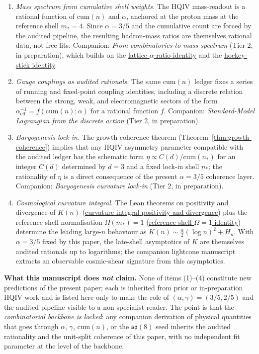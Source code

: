 \documentclass[11pt]{amsart}
\begin{document}
\begin{enumerate}
  \item \emph{Mass spectrum from cumulative shell weights.} The HQIV mass-readout is a rational function of \(\mathrm{cum}(n)\) and \(\alpha\), anchored at the proton mass at the reference shell \(m_\ast=4\). Since \(\alpha=3/5\) and the cumulative count are forced by the audited pipeline, the resulting hadron-mass ratios are themselves rational data, not free fits. Companion: \emph{From combinatorics to mass spectrum} (Tier 2, in preparation), which builds on the \hyperref[lean:lattice-ratio]{lattice \(\alpha\)-ratio identity} and the \hyperref[lean:hockey-stick]{hockey-stick identity}.
  \item \emph{Gauge couplings as audited rationals.} The same \(\mathrm{cum}(n)\) ledger fixes a series of running and fixed-point coupling identities, including a discrete relation between the strong, weak, and electromagnetic sectors of the form \(\alpha_{\text{eff}}^{-1}=f(\mathrm{cum}(n);\alpha)\) for a rational function \(f\). Companion: \emph{Standard-Model Lagrangian from the discrete action} (Tier 2, in preparation).
  \item \emph{Baryogenesis lock-in.} The growth-coherence theorem (Theorem~\ref{thm:growth-coherence}) implies that any HQIV asymmetry parameter compatible with the audited ledger has the schematic form \(\eta\propto C(d)/\mathrm{cum}(n_\ast)\) for an integer \(C(d)\) determined by \(d=3\) and a fixed lock-in shell \(n_\ast\); the rationality of \(\eta\) is a direct consequence of the present \(\alpha=3/5\) coherence layer. Companion: \emph{Baryogenesis curvature lock-in} (Tier 2, in preparation).
  \item \emph{Cosmological curvature integral.} The Lean theorems on positivity and divergence of \(K(n)\) (\hyperref[lean:curvature-int]{curvature integral positivity and divergence}) plus the reference-shell normalisation \(\Omega(m_\ast)=1\) (\hyperref[lean:omega-ref]{reference-shell \(\Omega=1\) identity}) determine the leading large-\(n\) behaviour as \(K(n)\sim \tfrac{\alpha}{2}(\log n)^2 + H_n\). With \(\alpha=3/5\) fixed by this paper, the late-shell asymptotics of \(K\) are themselves audited rationals up to logarithms; the companion lightcone manuscript \cite{hqiv-lightcone-paper} extracts an observable cosmic-shear signature from this asymptotics.
\end{enumerate}

\noindent \textbf{What this manuscript does \emph{not} claim.} None of items (1)--(4) constitute new predictions of the present paper; each is inherited from prior or in-preparation HQIV work and is listed here only to make the role of \((\alpha,\gamma)=(3/5,2/5)\) and the audited pipeline visible to a non-specialist reader. The point is that the \emph{combinatorial backbone is locked}: any companion derivation of physical quantities that goes through \(\alpha\), \(\gamma\), \(\mathrm{cum}(n)\), or the \(\mathfrak{so}(8)\) seed inherits the audited rationality and the unit-split coherence of this paper, with no independent fit parameter at the level of the backbone.
\end{document}
